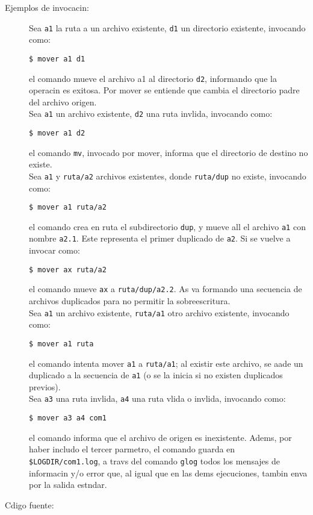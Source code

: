 \documentclass[12pt]{article}
\begin{document}
\begin{description}
	\item [Ejemplos de invocacin:]
	Sea \verb|a1| la ruta a un archivo existente, \verb|d1| un directorio existente, invocando como:
	\begin{verbatim}$ mover a1 d1\end{verbatim}
	el comando mueve el archivo a1 al directorio \verb|d2|, informando que la operacin es exitosa. Por mover se entiende que cambia el directorio padre del archivo origen.\\
	Sea \verb|a1| un archivo existente, \verb|d2| una ruta invlida, invocando como:
	\begin{verbatim}$ mover a1 d2\end{verbatim}
	el comando \verb|mv|, invocado por mover, informa que el directorio de destino no existe.\\
	Sea \verb|a1| y \verb|ruta/a2| archivos existentes, donde \verb|ruta/dup| no existe, invocando como:
	\begin{verbatim}$ mover a1 ruta/a2\end{verbatim}
	el comando crea en ruta el subdirectorio \verb|dup|, y mueve all el archivo \verb|a1| con nombre \verb|a2.1|. Este representa el primer duplicado de \verb|a2|. Si se vuelve a invocar como:
	\begin{verbatim}$ mover ax ruta/a2\end{verbatim}
	el comando mueve \verb|ax| a \verb|ruta/dup/a2.2|. As va formando una secuencia de archivos duplicados para no permitir la sobreescritura.\\
	Sea \verb|a1| un archivo existente, \verb|ruta/a1| otro archivo existente, invocando como:
	\begin{verbatim}$ mover a1 ruta\end{verbatim}
	el comando intenta mover \verb|a1| a \verb|ruta/a1|; al existir este archivo, se aade un duplicado a la secuencia de \verb|a1| (o se la inicia si no existen duplicados previos).\\
	Sea \verb|a3| una ruta invlida, \verb|a4| una ruta vlida o invlida, invocando como:
	\begin{verbatim}$ mover a3 a4 com1\end{verbatim}
	el comando informa que el archivo de origen es inexistente. Adems, por haber includo el tercer parmetro, el comando guarda en \verb|$LOGDIR/com1.log|, a travs del comando \verb|glog| todos los mensajes de informacin y/o error que, al igual que en las dems ejecuciones, tambin enva por la salida estndar.
	
	\item [Cdigo fuente:]
\end{description}
{\footnotesize

}
\end{document}

